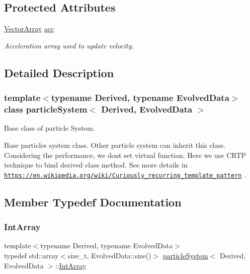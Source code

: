 \subsection*{Protected Attributes}
\begin{DoxyCompactItemize}
\item 
\mbox{\hyperlink{classparticle_system_a6f66ed187a286c0d42ab2f83b8b6193b}{Vector\+Array}} \mbox{\hyperlink{classparticle_system_ad7e503534c878abae38d4b06f50286fb}{acc}}
\begin{DoxyCompactList}\small\item\em Acceleration array used to update velocity. \end{DoxyCompactList}\end{DoxyCompactItemize}


\subsection{Detailed Description}
\subsubsection*{template$<$typename Derived, typename Evolved\+Data$>$\newline
class particle\+System$<$ Derived, Evolved\+Data $>$}

Base class of particle System. 

Base particles system class. Other particle system can inherit this class. Considering the performance, we don\textquotesingle{}t set virtual function. Here we use C\+R\+TP technique to bind derived class method. See more details in \href{https://en.wikipedia.org/wiki/Curiously_recurring_template_pattern}{\tt https\+://en.\+wikipedia.\+org/wiki/\+Curiously\+\_\+recurring\+\_\+template\+\_\+pattern} . 

\subsection{Member Typedef Documentation}
\mbox{\label{classparticle_system_aee9dc82f46ce17a477251805094cf19f}} 
\subsubsection{\texorpdfstring{Int\+Array}{IntArray}}
{\footnotesize\ttfamily template$<$typename Derived, typename Evolved\+Data$>$ \\
typedef std\+::array$<$size\+\_\+t, Evolved\+Data\+::size()$>$ \mbox{\hyperlink{classparticle_system}{particle\+System}}$<$ Derived, Evolved\+Data $>$\+::\mbox{\hyperlink{classparticle_system_aee9dc82f46ce17a477251805094cf19f}{Int\+Array}}}

